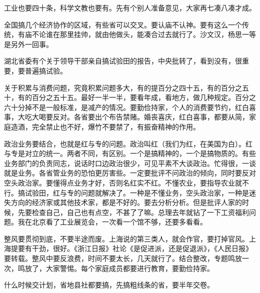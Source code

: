 工业也要四十条，科学文教也要有。先有个别人准备意见，大家再七凑八凑才成。

全国搞几个经济协作的区域，有些省可以交叉。要认庙不认神。要有这么一个传统，有庙不论谁在那里挂帅，就由他做头，能凑合过去就行了。沙文汉，杨思一等是另外一回事。

湖北省委有个关于领导干部亲自搞试验田的报告，中央批转了，看到没有，很重要，要普遍搞试验。

关于积累与消费问题，究竟积累问题多大，有的提百分之四十五，有的百分之五十，有的百分之五十五。最好一半一半，要看年成，看地方，做几种规定。百分之六十分掉不是一般标准，是减产的情况。要勤俭持家，个人的消费要节约，红白喜事，大吃大喝要反对。各省要出个布告禁赌。婚丧喜庆，红白喜事，都要从简，家庭造酒，完全禁止也不好，爆竹不要禁了，有振奋精神的作用。

政治业务要结合，也就是红与专的问题。政治叫红（我们为红，在美国为白）。红与专是对立的统一。两者不同，有区别。一个是搞精神的，一个是搞物质的。有些业务部门的负责同志，说话时口边政治很少，可见平素不大谈政治。忙得很，一谈就是业务。各省管业务的恐怕更厉害些。一定要批评不问政治的倾向，同时要反对空头政治家。要懂得点业务才好，否则名红实不红。不懂农业，要指导农业就不行。搞试验田，红与专的问题就解决了。一种是不懂业务，空头政治家，一种是迷失方向的经济家或其他技术家，都是不好的。要去分析分析。但是批评人家的时候，先要检查自己，自己也有点空，不甚了了嘛。总理去年就钻了一下工资福利问题。我在北京看了工业展览会，一次看一个馆不够，还要多看看。

整风要贯彻到底，不要半途而废。上海说的第三类人，就会作官，要打掉官风。上海提要有干劲，很好。《浙江日报》社论《是促进派，还是促退派》，《人民日报》要转载。整风中要反浪费，时间不要太长，几天就行了。结合整改，专题鸣放一次，鸣放了，大家警惕。每个家庭成员都要进行教育，要勤俭持家。

什么时候交计划，省地县社都要搞，先搞粗线条的省，要半年交卷。

